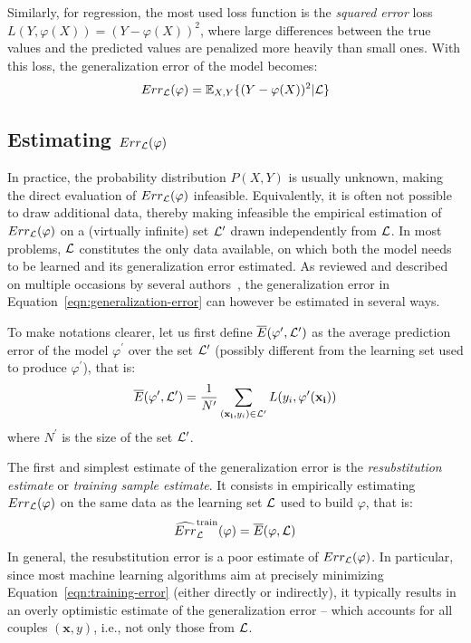 Similarly, for regression, the most used loss function is the \textit{squared
error} loss $L(Y, \varphi(X)) = (Y - \varphi(X))^2$, where large differences
between the true values and the predicted values are penalized more heavily
than small ones. With this loss, the generalization error of the model becomes:
\begin{equation}
Err_{\cal L}(\varphi) = \mathbb{E}_{X, Y}\{ (Y - \varphi(X))^2 | {\cal L} \}
\end{equation}

\subsection{Estimating $Err_{\cal L}(\varphi)$}
\label{sec:2:estimating-generalization-error}

In practice, the probability distribution $P(X, Y)$ is usually unknown, making
the direct evaluation of $Err_{\cal L}(\varphi)$ infeasible. Equivalently, it
is often not possible to draw additional data, thereby making infeasible the
empirical estimation of $Err_{\cal L}(\varphi)$ on a (virtually infinite) set
${\cal L}'$ drawn independently from ${\cal L}$. In most problems, ${\cal L}$
constitutes the only data available, on which both the model needs to be
learned and its generalization error estimated. As reviewed and described on
multiple occasions by several
authors~\citep{toussaint:1974,stone:1978,breiman:1984,kohavi:1995,nadeau:2003,hastie:2005,arlot:2010},
the generalization error in Equation~\ref{eqn:generalization-error} can however
be estimated in several ways.

To make notations clearer, let us first define $\overline{E}(\varphi^\prime, {\cal
L}^\prime)$ as the average prediction error of the model $\varphi^\prime$ over the set
${\cal L}^\prime$ (possibly different from the learning set used to produce
$\varphi^\prime$), that is:
\begin{equation}
\overline{E}(\varphi^\prime, {\cal L}^\prime) = \frac{1}{N^\prime} \sum_{(\mathbf{x_i}, y_i) \in {\cal L}^\prime} L(y_i, \varphi^\prime(\mathbf{x_i}))
\end{equation}
where $N^\prime$ is the size of the set ${\cal L}^\prime$.

The first and simplest estimate of the generalization error is the
\textit{resubstitution estimate} or \textit{training sample estimate}. It
consists in empirically estimating $Err_{\cal L}(\varphi)$ on the same data as
the learning set ${\cal L}$ used to build $\varphi$, that is:
\begin{equation}\label{eqn:training-error}
\widehat{Err}_{\cal L}^\text{train}(\varphi) = \overline{E}(\varphi, {\cal L})
\end{equation}
In general, the resubstitution error is a poor estimate of $Err_{\cal
L}(\varphi)$. In particular, since most machine learning algorithms aim at
precisely minimizing Equation~\ref{eqn:training-error} (either directly or
indirectly), it typically results in an overly optimistic estimate of the
generalization error -- which accounts for all couples $(\mathbf{x}, y)$, i.e.,
not only those from ${\cal L}$.

